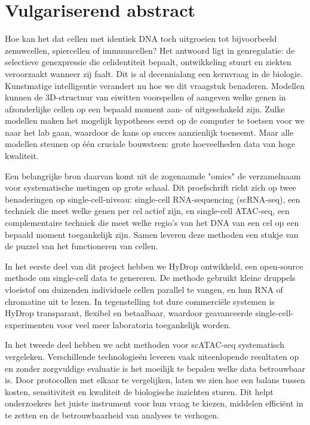 \chapter*{Vulgariserend abstract}
Hoe kan het dat cellen met identiek DNA toch uitgroeien tot bijvoorbeeld zenuwcellen, spiercellen of immuuncellen? Het antwoord ligt in genregulatie: de selectieve genexpressie die celidentiteit bepaalt, ontwikkeling stuurt en ziekten veroorzaakt wanneer zij faalt. Dit is al decennialang een kernvraag in de biologie. Kunstmatige intelligentie verandert nu hoe we dit vraagstuk benaderen. Modellen kunnen de 3D-structuur van eiwitten voorspellen of aangeven welke genen in afzonderlijke cellen op een bepaald moment aan- of uitgeschakeld zijn. Zulke modellen maken het mogelijk hypotheses eerst op de computer te toetsen voor we naar het lab gaan, waardoor de kans op succes aanzienlijk toeneemt. Maar alle modellen steunen op één cruciale bouwsteen: grote hoeveelheden data van hoge kwaliteit.

Een belangrijke bron daarvan komt uit de zogenaamde "omics"\llap{,} de verzamelnaam voor systematische metingen op grote schaal. Dit proefschrift richt zich op twee benaderingen op single-cell-niveau: single-cell RNA-sequencing (scRNA-seq), een techniek die meet welke genen per cel actief zijn, en single-cell ATAC-seq, een complementaire techniek die meet welke regio's van het DNA van een cel op een bepaald moment toegankelijk zijn. Samen leveren deze methoden een stukje van de puzzel van het functioneren van cellen.

In het eerste deel van dit project hebben we HyDrop ontwikkeld, een open-source methode om single-cell data te genereren. De methode gebruikt kleine druppels vloeistof om duizenden individuele cellen parallel te vangen, en hun RNA of chromatine uit te lezen. In tegenstelling tot dure commerciële systemen is HyDrop transparant, flexibel en betaalbaar, waardoor geavanceerde single-cell-experimenten voor veel meer laboratoria toegankelijk worden.

In het tweede deel hebben we acht methoden voor scATAC-seq systematisch vergeleken. Verschillende technologieën leveren vaak uiteenlopende resultaten op en zonder zorgvuldige evaluatie is het moeilijk te bepalen welke data betrouwbaar is. Door protocollen met elkaar te vergelijken, laten we zien hoe een balans tussen kosten, sensitiviteit en kwaliteit de biologische inzichten sturen. Dit helpt onderzoekers het juiste instrument voor hun vraag te kiezen, middelen efficiënt in te zetten en de betrouwbaarheid van analyses te verhogen.

